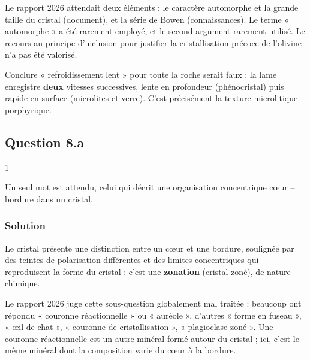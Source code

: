 \documentclass[11pt,a4paper]{article}
\begin{document}
\begin{jury}

Le rapport 2026 attendait deux éléments : le caractère automorphe et la grande taille du cristal (document), et la série de Bowen (connaissances). Le terme « automorphe » a été rarement employé, et le second argument rarement utilisé. Le recours au principe d'inclusion pour justifier la cristallisation précoce de l'olivine n'a pas été valorisé.

\end{jury}

\begin{piege}

Conclure « refroidissement lent » pour toute la roche serait faux : la lame enregistre \textbf{deux} vitesses successives, lente en profondeur (phénocristal) puis rapide en surface (microlites et verre). C'est précisément la texture microlitique porphyrique.

\end{piege}

\hypertarget{question-8.a}{%
\subsection{Question 8.a}\label{question-8.a}}

\begin{indication}{1}

Un seul mot est attendu, celui qui décrit une organisation concentrique cœur -- bordure dans un cristal.

\end{indication}

\hypertarget{solution-23}{%
\subsubsection{Solution}\label{solution-23}}

Le cristal présente une distinction entre un cœur et une bordure, soulignée par des teintes de polarisation différentes et des limites concentriques qui reproduisent la forme du cristal : c'est une \textbf{zonation} (cristal zoné), de nature chimique.

\begin{piege}

Le rapport 2026 juge cette sous-question globalement mal traitée : beaucoup ont répondu « couronne réactionnelle » ou « auréole », d'autres « forme en fuseau », « œil de chat », « couronne de cristallisation », « plagioclase zoné ». Une couronne réactionnelle est un autre minéral formé autour du cristal ; ici, c'est le même minéral dont la composition varie du cœur à la bordure.

\end{piege}
\end{document}
